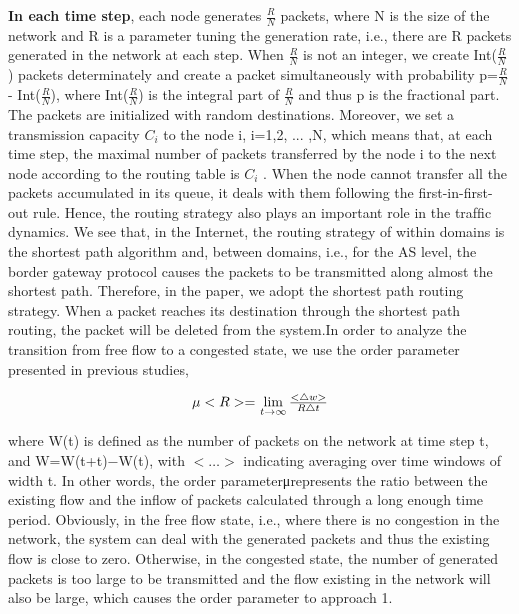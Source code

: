 \documentclass[onecolumn,preprintnumbers,amsmath,amssymb]{revtex4}
\begin{document}
{\bf In each time step}, each node generates $\frac{R}{N}$ packets, where N is the size of the network and R is a parameter tuning the generation rate, i.e., there are R packets generated in the network at each step. When $\frac{R}{N}$ is not an integer, we create Int($\frac{R}{N}$) packets determinately and create a packet simultaneously with probability p=$\frac{R}{N}$ - Int($\frac{R}{N}$), where Int($\frac{R}{N}$) is the integral part of $\frac{R}{N}$ and thus p is the fractional part. The packets are initialized with random destinations. Moreover, we set a transmission capacity $C_i$ to the node i, i=1,2, ... ,N, which means that, at each time step, the maximal number of packets transferred by the node i to the next node according to the routing table is $C_i$ . When the node cannot transfer all the packets accumulated in its queue, it deals with them following the ﬁrst-in-ﬁrst-out rule. Hence, the routing strategy also plays an important role in the trafﬁc dynamics. We see that, in the Internet, the routing strategy of within domains is the shortest path algorithm and, between domains, i.e., for the AS level, the border gateway protocol causes the packets to be transmitted along almost the shortest path\cite{BVL}. Therefore, in the paper, we adopt the shortest path routing strategy. When a packet reaches its destination through the shortest path routing, the packet will be deleted from the system.In order to analyze the transition from free ﬂow to a congested state, we use the order parameter presented in previous studies\cite{MEN},

\begin{equation}
\centerline{
$\mu<R>=$
$\lim\limits_{t \to \infty }{\frac{< \bigtriangleup w >}{R\bigtriangleup t}}$
}
\end{equation}

where W(t) is deﬁned as the number of packets on the network at time step t, and W=W(t+t)−W(t), with $<…>$ indicating averaging over time windows of width t. In other words, the order parameterμrepresents the ratio between the existing ﬂow and the inﬂow of packets calculated through a long enough time period. Obviously, in the free ﬂow state, i.e., where there is no congestion in the network, the system can deal with the generated packets and thus the existing ﬂow is close to zero. Otherwise, in the congested state, the number of generated packets is too large to be transmitted and the ﬂow existing in the network will also be large, which causes the order parameter to approach 1.

\end{document}

